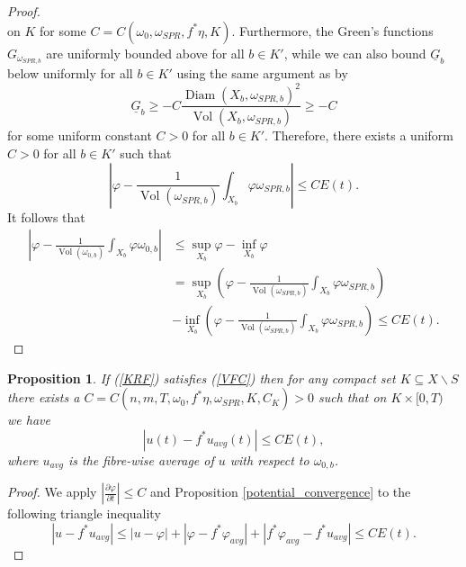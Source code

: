 \documentclass[12pt]{article}
\newtheorem{proposition}[theorem]{Proposition}
\numberwithin{equation}{section}
\renewcommand{\d}{\partial}
\DeclareMathOperator{\Vol}{Vol}
\DeclareMathOperator{\Diam}{Diam}
\begin{document}
\begin{proof}
\begin{equation*}
\end{equation*}
on $K$ for some $C = C(\omega_0, \omega_{SPR}, f^*\eta, K)$. Furthermore, the Green's functions $G_{\omega_{SPR,b}}$ are uniformly bounded above for all $b \in K'$, while we can also bound $\underline{G}_b$ below uniformly for all $b \in K'$ using the same argument as \cite[Lem. 3.4]{ZZ20} by
\begin{equation*}
    \underline{G}_b \geq -C \frac{\Diam(X_b,\omega_{SPR,b})^2}{\Vol(X_b,\omega_{SPR,b})} \geq -C
\end{equation*}
for some uniform constant $C > 0$ for all $b \in K'$. Therefore, there exists a uniform $C > 0$ for all $b \in K'$ such that
\begin{equation*}
    \left|\varphi - \frac{1}{\Vol(\omega_{SPR,b})} \int_{X_b} \varphi \omega_{SPR,b}\right| \leq CE(t).
\end{equation*}
It follows that 
\begin{align*}
    \left|\varphi - \frac{1}{\Vol(\omega_{0,b})} \int_{X_b} \varphi \omega_{0,b}\right|
    &\leq \sup_{X_b} \varphi - \inf_{X_b} \varphi\\
    &= \sup_{X_b} \left(\varphi - \frac{1}{\Vol(\omega_{SPR,b})}\int_{X_b} \varphi \omega_{SPR,b}\right)\\
    &- \inf_{X_b} \left(\varphi - \frac{1}{\Vol(\omega_{SPR,b})}\int_{X_b} \varphi \omega_{SPR,b} \right) \leq CE(t).
\end{align*}
\end{proof}

\begin{proposition}
If (\ref{KRF}) satisfies (\ref{VFC}) then for any compact set $K \subseteq X \backslash S$ there exists a $C = C(n,m,T,\omega_0,f^*\eta, \omega_{SPR}, K, C_K) > 0$ such that on $K \times [0,T)$ we have
\begin{equation*}
    |u(t)-f^*u_{avg}(t)| \leq CE(t),
\end{equation*}
where $u_{avg}$ is the fibre-wise average of $u$ with respect to $\omega_{0,b}$.
\end{proposition}

\begin{proof}
We apply $\left|\frac{\d\varphi}{\d t}\right| \leq C$ and Proposition \ref{potential_convergence} to the following triangle inequality
\begin{equation*}
    |u-f^* u_{avg}| \leq |u-\varphi| + |\varphi - f^* \varphi_{avg}| + |f^* \varphi_{avg} - f^* u_{avg}| \leq CE(t).
\end{equation*}
\end{proof}
\end{document}
